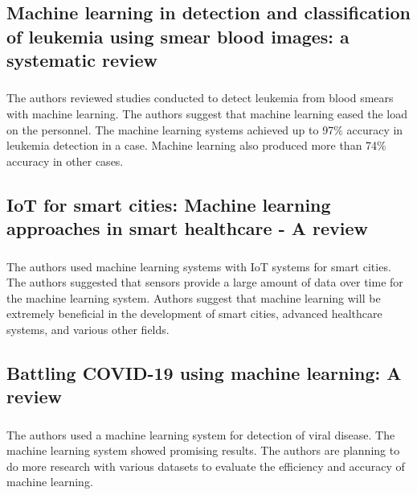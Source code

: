 \subsection{Machine learning in detection and classification of leukemia using smear blood images: a systematic review}
\subsubsection{\citeauthor*{ref_paper_15} \citeyearpar{ref_paper_15}}

The authors reviewed studies conducted to detect leukemia from blood smears with machine learning. The authors suggest that machine learning eased the load on the personnel. The machine learning systems achieved up to 97\% accuracy in leukemia detection in a case. Machine learning also produced more than 74\% accuracy in other cases.

\subsection{IoT for smart cities: Machine learning approaches in smart healthcare - A review}
\subsubsection{\citeauthor*{ref_paper_29} \citeyearpar{ref_paper_29}}

The authors used machine learning systems with IoT systems for smart cities. The authors suggested that sensors provide a large amount of data over time for the machine learning system. Authors suggest that machine learning will be extremely beneficial in the development of smart cities, advanced healthcare systems, and various other fields.

\subsection{Battling COVID-19 using machine learning: A review}
\subsubsection{\citeauthor*{ref_paper_20} \citeyearpar{ref_paper_20}}

The authors used a machine learning system for detection of viral disease. The machine learning system showed promising results. The authors are planning to do more research with various datasets to evaluate the efficiency and accuracy of machine learning.


